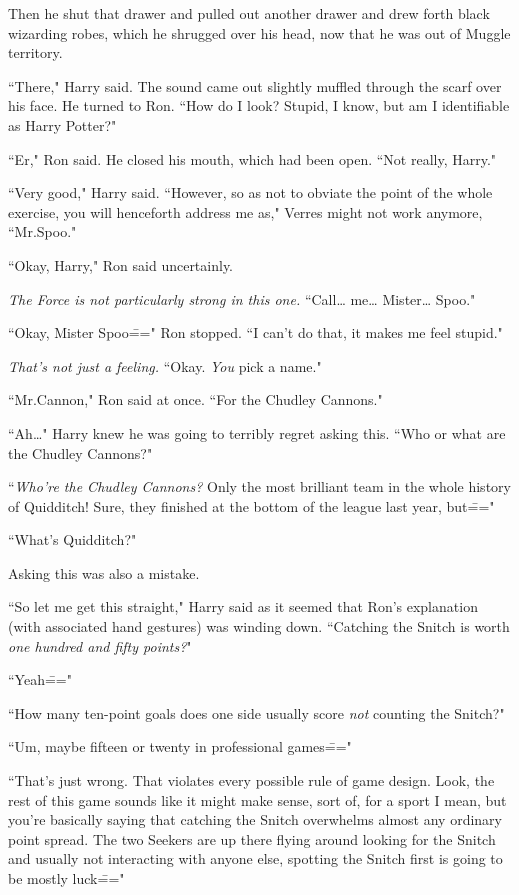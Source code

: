 Then he shut that drawer and pulled out another drawer and drew forth black wizarding robes, which he shrugged over his head, now that he was out of Muggle territory.

``There," Harry said. The sound came out slightly muffled through the scarf over his face. He turned to Ron. ``How do I look? Stupid, I know, but am I identifiable as Harry Potter?"

``Er," Ron said. He closed his mouth, which had been open. ``Not really, Harry."

``Very good," Harry said. ``However, so as not to obviate the point of the whole exercise, you will henceforth address me as," Verres might not work anymore, ``Mr.\?Spoo."

``Okay, Harry," Ron said uncertainly.

\emph{The Force is not particularly strong in this one.} ``Call{\ldots} me{\ldots} Mister{\ldots} Spoo."

``Okay, Mister Spoo\===" Ron stopped. ``I can't do that, it makes me feel stupid."

\emph{That's not just a feeling.} ``Okay. \emph{You} pick a name."

``Mr.\?Cannon," Ron said at once. ``For the Chudley Cannons."

``Ah{\ldots}" Harry knew he was going to terribly regret asking this. ``Who or what are the Chudley Cannons?"

``\emph{Who're the Chudley Cannons?} Only the most brilliant team in the whole history of Quidditch! Sure, they finished at the bottom of the league last year, but\==="

``What's Quidditch?"

Asking this was also a mistake.

``So let me get this straight," Harry said as it seemed that Ron's explanation (with associated hand gestures) was winding down. ``Catching the Snitch is worth \emph{one hundred and fifty points?}"

``Yeah\==="

``How many ten-point goals does one side usually score \emph{not} counting the Snitch?"

``Um, maybe fifteen or twenty in professional games\==="

``That's just wrong. That violates every possible rule of game design. Look, the rest of this game sounds like it might make sense, sort of, for a sport I mean, but you're basically saying that catching the Snitch overwhelms almost any ordinary point spread. The two Seekers are up there flying around looking for the Snitch and usually not interacting with anyone else, spotting the Snitch first is going to be mostly luck\==="

